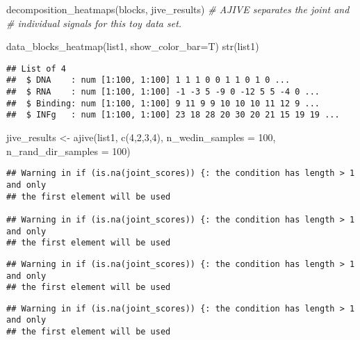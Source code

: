 \documentclass[
]{article}
\newenvironment{Shaded}{\begin{snugshade}}{\end{snugshade}}
\newcommand{\AttributeTok}[1]{\textcolor[rgb]{0.77,0.63,0.00}{#1}}
\newcommand{\CommentTok}[1]{\textcolor[rgb]{0.56,0.35,0.01}{\textit{#1}}}
\newcommand{\DecValTok}[1]{\textcolor[rgb]{0.00,0.00,0.81}{#1}}
\newcommand{\FunctionTok}[1]{\textcolor[rgb]{0.00,0.00,0.00}{#1}}
\newcommand{\NormalTok}[1]{#1}
\newcommand{\OtherTok}[1]{\textcolor[rgb]{0.56,0.35,0.01}{#1}}
\begin{document}
\begin{Shaded}
\begin{Highlighting}[]
\FunctionTok{decomposition\_heatmaps}\NormalTok{(blocks, jive\_results)}
\CommentTok{\#  AJIVE separates the joint and}
\CommentTok{\#  individual signals for this toy data set.}

\FunctionTok{data\_blocks\_heatmap}\NormalTok{(list1, }\AttributeTok{show\_color\_bar=}\NormalTok{T)}
\FunctionTok{str}\NormalTok{(list1)}
\end{Highlighting}
\end{Shaded}

\begin{verbatim}
## List of 4
##  $ DNA    : num [1:100, 1:100] 1 1 1 0 0 1 1 0 1 0 ...
##  $ RNA    : num [1:100, 1:100] -1 -3 5 -9 0 -12 5 5 -4 0 ...
##  $ Binding: num [1:100, 1:100] 9 11 9 9 10 10 10 11 12 9 ...
##  $ INFg   : num [1:100, 1:100] 23 18 28 20 30 20 21 15 19 19 ...
\end{verbatim}

\begin{Shaded}
\begin{Highlighting}[]
\NormalTok{jive\_results }\OtherTok{\textless{}{-}} \FunctionTok{ajive}\NormalTok{(list1, }\FunctionTok{c}\NormalTok{(}\DecValTok{4}\NormalTok{,}\DecValTok{2}\NormalTok{,}\DecValTok{3}\NormalTok{,}\DecValTok{4}\NormalTok{), }\AttributeTok{n\_wedin\_samples =} \DecValTok{100}\NormalTok{,}
                      \AttributeTok{n\_rand\_dir\_samples =} \DecValTok{100}\NormalTok{)}
\end{Highlighting}
\end{Shaded}

\begin{verbatim}
## Warning in if (is.na(joint_scores)) {: the condition has length > 1 and only
## the first element will be used

## Warning in if (is.na(joint_scores)) {: the condition has length > 1 and only
## the first element will be used
\end{verbatim}

\begin{verbatim}
## Warning in if (is.na(joint_scores)) {: the condition has length > 1 and only
## the first element will be used
\end{verbatim}

\begin{verbatim}
## Warning in if (is.na(joint_scores)) {: the condition has length > 1 and only
## the first element will be used
\end{verbatim}
\end{document}
